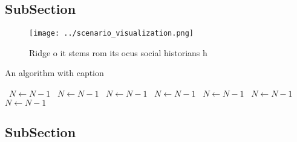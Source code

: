\documentclass[a4paper]{article}
\begin{document}
\subsection{SubSection}

\begin{figure}
\centering
\texttt{[image: ../scenario\_visualization.png]}
\caption{Ridge o it stems rom its ocus social historians h
}
\end{figure}
 
\begin{algorithm}
\caption{An algorithm with caption}
\begin{algorithmic}
\    \State $N \gets N - 1$
\    \State $N \gets N - 1$
\    \State $N \gets N - 1$
\    \State $N \gets N - 1$
\    \State $N \gets N - 1$
\    \State $N \gets N - 1$
\    \State $N \gets N - 1$
\EndWhile
\end{algorithmic}
\end{algorithm}

\subsection{SubSection}
\end{document}
